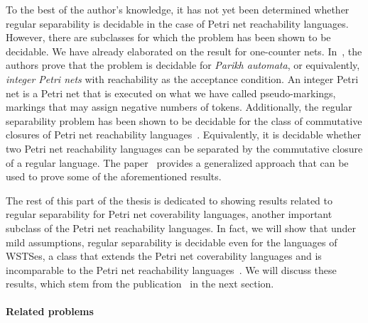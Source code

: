 \documentclass[../../diss.tex]{subfiles}
\begin{document}
To the best of the author's knowledge, it has not yet been determined whether regular separability is decidable in the case of Petri net reachability languages.
However, there are subclasses for which the problem has been shown to be decidable.
We have already elaborated on the result for one-counter nets.
In~\cite{ClementeCLP17}, the authors prove that the problem is decidable for \emph{Parikh automata}, or equivalently, \emph{integer Petri nets} with reachability as the acceptance condition.
An integer Petri net is a Petri net that is executed on what we have called pseudo-markings, markings that may assign negative numbers of tokens.
%
Additionally, the regular separability problem has been shown to be decidable for the class of commutative closures of Petri net reachability languages~\cite{ClementeCLP17b}.
Equivalently, it is decidable whether two Petri net reachability languages can be separated by the commutative closure of a regular language.
The paper~\cite{CzerwinskiZ20} provides a generalized approach that can be used to prove some of the aforementioned results.

The rest of this part of the thesis is dedicated to showing results related to regular separability for Petri net coverability languages, another important subclass of the Petri net reachability languages.
In fact, we will show that under mild assumptions, regular separability is decidable even for the languages of WSTSes, a class that extends the Petri net coverability languages and is incomparable to the Petri net reachability languages~\cite{GeeraertsRV07}.
We will discuss these results, which stem from the publication~\cite{CzerwinskiLMMKS18} in the next section.

\paragraph{Related problems}
\end{document}
